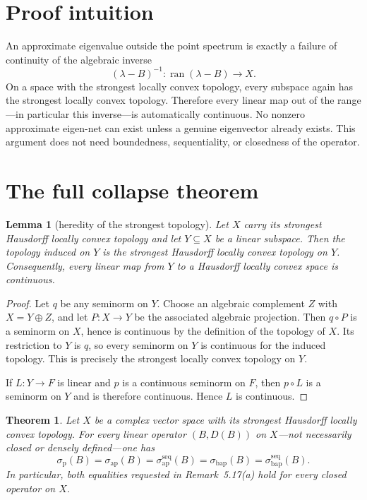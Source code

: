 \documentclass[11pt]{article}
\newtheorem{theorem}{Theorem}
\newtheorem{lemma}{Lemma}
\newcommand{\sap}{\sigma_{\mathrm{ap}}}
\newcommand{\sbap}{\sigma_{\mathrm{bap}}}
\newcommand{\spoint}{\sigma_{\mathrm p}}
\newcommand{\saseq}{\sigma_{\mathrm{ap}}^{\mathrm{seq}}}
\newcommand{\sbseq}{\sigma_{\mathrm{bap}}^{\mathrm{seq}}}
\begin{document}
\section{Proof intuition}

An approximate eigenvalue outside the point spectrum is exactly a failure of
continuity of the algebraic inverse
\[
 (\lambda-B)^{-1}\colon \operatorname{ran}(\lambda-B)\longrightarrow X.
\]
On a space with the strongest locally convex topology, every subspace again
has the strongest locally convex topology.  Therefore every linear map out of
the range---in particular this inverse---is automatically continuous.  No
nonzero approximate eigen-net can exist unless a genuine eigenvector already
exists.  This argument does not need boundedness, sequentiality, or closedness
of the operator.

\section{The full collapse theorem}

\begin{lemma}[heredity of the strongest topology]\label{lem:heredity}
Let $X$ carry its strongest Hausdorff locally convex topology and let
$Y\subseteq X$ be a linear subspace.  Then the topology induced on $Y$ is the
strongest Hausdorff locally convex topology on $Y$.  Consequently, every
linear map from $Y$ to a Hausdorff locally convex space is continuous.
\end{lemma}

\begin{proof}
Let $q$ be any seminorm on $Y$.  Choose an algebraic complement $Z$ with
$X=Y\oplus Z$, and let $P\colon X\to Y$ be the associated algebraic
projection.  Then $q\circ P$ is a seminorm on $X$, hence is continuous by the
definition of the topology of $X$.  Its restriction to $Y$ is $q$, so every
seminorm on $Y$ is continuous for the induced topology.  This is precisely the
strongest locally convex topology on $Y$.

If $L\colon Y\to F$ is linear and $p$ is a continuous seminorm on $F$, then
$p\circ L$ is a seminorm on $Y$ and is therefore continuous.  Hence $L$ is
continuous.
\end{proof}

\begin{theorem}\label{thm:collapse}
Let $X$ be a complex vector space with its strongest Hausdorff locally convex
topology.  For every linear operator $(B,D(B))$ on $X$---not necessarily
closed or densely defined---one has
\[
 \boxed{
 \spoint(B)=\sap(B)=\saseq(B)=\sbap(B)=\sbseq(B).}
\]
In particular, both equalities requested in Remark~5.17(a) hold for every
closed operator on $X$.
\end{theorem}
\end{document}
